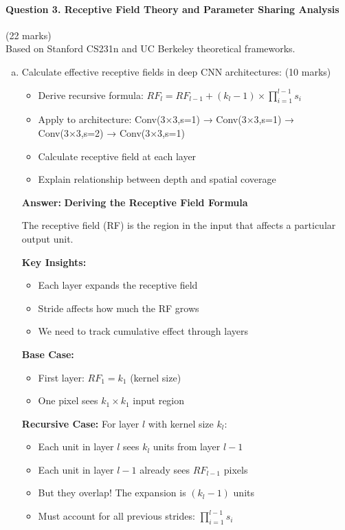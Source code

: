 \documentclass[12pt]{article}
\newcommand{\answer}[1]{{\color{answercolor}\textbf{Answer:} #1}}
\newcommand{\explanation}[1]{{\color{explanationcolor}#1}}
\begin{document}
\newpage
\paragraph{Question 3. Receptive Field Theory and Parameter Sharing Analysis}{{\hfill (22 marks)}}\\
Based on Stanford CS231n and UC Berkeley theoretical frameworks.

\begin{enumerate}[(a)]
    \item Calculate effective receptive fields in deep CNN architectures: \hfill (10 marks)
    \begin{itemize}
        \item Derive recursive formula: $RF_l = RF_{l-1} + (k_l - 1) \times \prod_{i=1}^{l-1} s_i$
        \item Apply to architecture: Conv(3×3,s=1) → Conv(3×3,s=1) → Conv(3×3,s=2) → Conv(3×3,s=1)
        \item Calculate receptive field at each layer
        \item Explain relationship between depth and spatial coverage
    \end{itemize}
    
    \answer{
    \textbf{Deriving the Receptive Field Formula}
    
    \explanation{
    The receptive field (RF) is the region in the input that affects a particular output unit.
    
    \textbf{Key Insights:}
    \begin{itemize}
        \item Each layer expands the receptive field
        \item Stride affects how much the RF grows
        \item We need to track cumulative effect through layers
    \end{itemize}
    
    \textbf{Base Case:}
    \begin{itemize}
        \item First layer: $RF_1 = k_1$ (kernel size)
        \item One pixel sees $k_1 \times k_1$ input region
    \end{itemize}
    
    \textbf{Recursive Case:}
    For layer $l$ with kernel size $k_l$:
    \begin{itemize}
        \item Each unit in layer $l$ sees $k_l$ units from layer $l-1$
        \item Each unit in layer $l-1$ already sees $RF_{l-1}$ pixels
        \item But they overlap! The expansion is $(k_l - 1)$ units
        \item Must account for all previous strides: $\prod_{i=1}^{l-1} s_i$
    \end{itemize}
    
}}
\end{enumerate}
\end{document}
